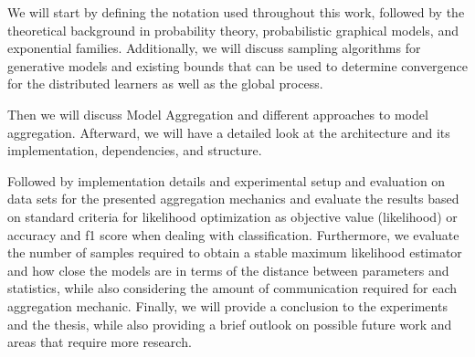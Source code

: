 We will start by defining the notation used throughout this work, followed by the theoretical background in probability theory, probabilistic graphical models, and exponential families.
Additionally, we will discuss sampling algorithms for generative models and existing bounds that can be used to determine convergence for the distributed learners as well as the global process.

Then we will discuss Model Aggregation and different approaches to model aggregation. 
Afterward, we will have a detailed look at the architecture and its implementation, dependencies, and structure.

Followed by implementation details and experimental setup and evaluation on data sets for the presented aggregation mechanics and evaluate the results based on standard criteria for likelihood optimization as objective value (likelihood) or accuracy and f1 score when dealing with classification. 
Furthermore, we evaluate the number of samples required to obtain a stable maximum likelihood estimator and how close the models are in terms of the distance between parameters and statistics, while also considering the amount of communication required for each aggregation mechanic.
Finally, we will provide a conclusion to the experiments and the thesis, while also providing a brief outlook on possible future work and areas that require more research.
